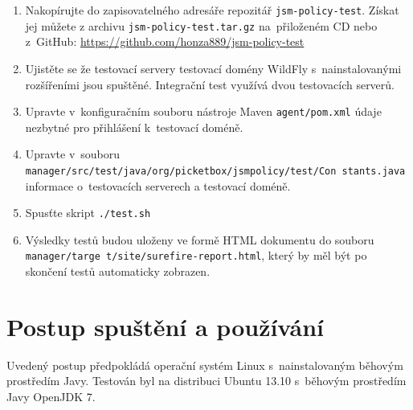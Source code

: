 \begin{enumerate}
  \item Nakopírujte do zapisovatelného adresáře repozitář {\tt jsm-policy-test}. Získat jej můžete z archivu {\tt jsm-policy-test.tar.gz} na~přiloženém CD nebo z~GitHub:
    \newline\url{https://github.com/honza889/jsm-policy-test}
  \item Ujistěte se že testovací servery testovací domény WildFly s~nainstalovanými rozšířeními jsou spuštěné. Integrační test využívá dvou testovacích serverů.
  \item Upravte v~konfiguračním souboru nástroje Maven {\tt agent/pom.xml} údaje nezbytné pro přihlášení k~testovací doméně.
  \item Upravte v~souboru {\tt manager/src/test/java/org/picketbox/jsmpolicy/test/Con stants.java} informace o~testovacích serverech a testovací doméně.
  \item Spusťte skript {\tt ./test.sh}
  \item Výsledky testů budou uloženy ve formě HTML dokumentu do souboru {\tt manager/targe t/site/surefire-report.html}, který by měl být po skončení testů automaticky zobrazen.
\end{enumerate}


\chapter{Postup spuštění a používání}\label{prilohaPouzivani}

Uvedený postup předpokládá operační systém Linux s~nainstalovaným běhovým prostředím Javy. Testován byl na distribuci Ubuntu 13.10 s~běhovým prostředím Javy OpenJDK 7.

